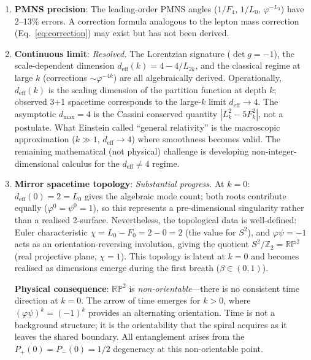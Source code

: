 \documentclass[12pt,a4paper]{article}
\begin{document}
\begin{enumerate}
The prime connection persists: down-quark $k$-spacings $\{5, 7\}$ and neutrino $k$-positions $\{5, 7, 11\}$ are all primes, and are \textbf{subsets of the Coxeter primes} (the prime elements of the stability spectrum). This links the flavor structure directly to the force hierarchy. Deriving the precise correction formula from the universal recurrence remains open.

\item \textbf{PMNS precision}: The leading-order PMNS angles ($1/F_4$, $1/L_0$, $\varphi^{-L_3}$) have 2--13\% errors. A correction formula analogous to the lepton mass correction (Eq.~\ref{eq:correction}) may exist but has not been derived.

\item \textbf{Continuous limit}: \emph{Resolved.} The Lorentzian signature ($\det g = -1$), the scale-dependent dimension $d_{\mathrm{eff}}(k) = 4 - 4/L_{2k}$, and the classical regime at large $k$ (corrections $\sim\varphi^{-4k}$) are all algebraically derived. Operationally, $d_{\mathrm{eff}}(k)$ is the scaling dimension of the partition function at depth $k$; observed 3+1 spacetime corresponds to the large-$k$ limit $d_{\mathrm{eff}} \to 4$. The asymptotic $d_{\max} = 4$ is the Cassini conserved quantity $|L_k^2 - 5F_k^2|$, not a postulate. What Einstein called ``general relativity'' is the macroscopic approximation ($k \gg 1$, $d_{\mathrm{eff}} \to 4$) where smoothness becomes valid. The remaining mathematical (not physical) challenge is developing non-integer-dimensional calculus for the $d_{\mathrm{eff}} \neq 4$ regime.

\item \textbf{Mirror spacetime topology}: \emph{Substantial progress.} At $k = 0$: $d_{\mathrm{eff}}(0) = 2 = L_0$ gives the algebraic mode count; both roots contribute equally ($\varphi^0 = \psi^0 = 1$), so this represents a pre-dimensional singularity rather than a realised 2-surface.  Nevertheless, the topological data is well-defined: Euler characteristic $\chi = L_0 - F_0 = 2 - 0 = 2$ (the value for $S^2$), and $\varphi\psi = -1$ acts as an orientation-reversing involution, giving the quotient $S^2/\mathbb{Z}_2 = \mathbb{RP}^2$ (real projective plane, $\chi = 1$).  This topology is latent at $k = 0$ and becomes realised as dimensions emerge during the first breath ($\beta \in (0,1)$).

\textbf{Physical consequence}: $\mathbb{RP}^2$ is \emph{non-orientable}---there is no consistent time direction at $k = 0$. The arrow of time emerges for $k > 0$, where $(\varphi\psi)^k = (-1)^k$ provides an alternating orientation. Time is not a background structure; it is the orientability that the spiral acquires as it leaves the shared boundary. All entanglement arises from the $P_+(0) = P_-(0) = 1/2$ degeneracy at this non-orientable point.


\end{enumerate}
\end{document}
